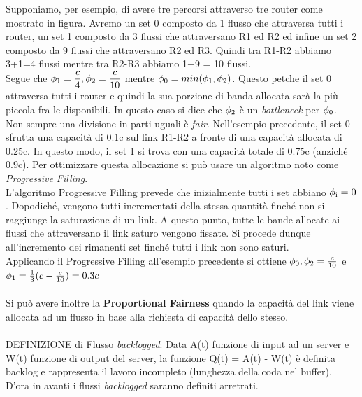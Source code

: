 \documentclass{article}
\begin{document}
Supponiamo, per esempio, di avere tre percorsi attraverso tre router come mostrato in figura. Avremo un set 0 composto da 1 flusso che attraversa tutti i router, un set 1 composto da 3 flussi che attraversano R1 ed R2 ed infine un set 2 composto da 9 flussi che attraversano R2 ed R3. Quindi tra R1-R2 abbiamo 3+1=4 flussi mentre tra R2-R3 abbiamo 1+9 = 10 flussi.\\
Segue che \(\displaystyle \phi\textsubscript{1} = \frac{c}{4}, \phi\textsubscript{2} = \frac{c}{10}\) mentre \(\displaystyle \phi\textsubscript{0} = min(\phi\textsubscript{1}, \phi\textsubscript{2})\). Questo petche il set 0 attraversa tutti i router e quindi la sua porzione di banda allocata sarà la più piccola fra le disponibili. In questo caso si dice che \(\displaystyle \phi\textsubscript{2} \) è un \textit{bottleneck} per \(\displaystyle \phi\textsubscript{0} \).\\
Non sempre una divisione in parti uguali è \textit{fair}. Nell'esempio precedente, il set 0 sfrutta una capacità di 0.1c sul link R1-R2 a fronte di una capacità allocata di 0.25c. In questo modo, il set 1 si trova con una capacità totale di 0.75c (anziché 0.9c). Per ottimizzare questa allocazione si può usare un algoritmo noto come \textit{Progressive Filling}.\\
L'algoritmo Progressive Filling prevede che inizialmente tutti i set abbiano \(\phi\textsubscript{i}=0\). Dopodiché, vengono tutti incrementati della stessa quantità finché non si raggiunge la saturazione di un link. A questo punto, tutte le bande allocate ai flussi che attraversano il link saturo vengono fissate. Si procede dunque all'incremento dei rimanenti set finché tutti i link non sono saturi.\\
Applicando il Progressive Filling all'esempio precedente si ottiene \( \phi\textsubscript{0}, \phi\textsubscript{2} = \frac{c}{10} \) e \( \phi\textsubscript{1} = \frac{1}{3}(c - \frac{c}{10}) = 0.3c\)\\ \\
Si può avere inoltre la \textbf{Proportional Fairness} quando la capacità del link viene allocata ad un flusso in base alla richiesta di capacità dello stesso.\\ \\
DEFINIZIONE di Flusso \textit{backlogged}: Data A(t) funzione di input ad un server e W(t) funzione di output del server, la funzione Q(t) = A(t) - W(t) è definita backlog e rappresenta il lavoro incompleto (lunghezza della coda nel buffer). D'ora in avanti i flussi \textit{backlogged} saranno definiti arretrati.\\ \\
\end{document}
